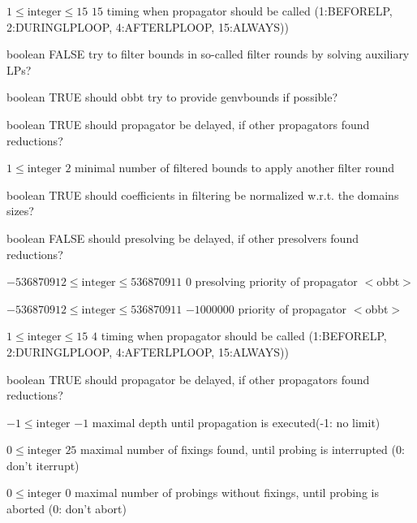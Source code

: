 %
{$1\leq\textrm{integer}\leq15$}%
{$15$}%
{timing when propagator should be called (1:BEFORELP, 2:DURINGLPLOOP, 4:AFTERLPLOOP, 15:ALWAYS))}%
{}

%
{boolean}%
{FALSE}%
{try to filter bounds in so-called filter rounds by solving auxiliary LPs?}%
{}

%
{boolean}%
{TRUE}%
{should obbt try to provide genvbounds if possible?}%
{}

%
{boolean}%
{TRUE}%
{should propagator be delayed, if other propagators found reductions?}%
{}

%
{$1\leq\textrm{integer}$}%
{$2$}%
{minimal number of filtered bounds to apply another filter round}%
{}

%
{boolean}%
{TRUE}%
{should coefficients in filtering be normalized w.r.t. the domains sizes?}%
{}

%
{boolean}%
{FALSE}%
{should presolving be delayed, if other presolvers found reductions?}%
{}

%
{$-536870912\leq\textrm{integer}\leq536870911$}%
{$0$}%
{presolving priority of propagator $<$obbt$>$}%
{}

%
{$-536870912\leq\textrm{integer}\leq536870911$}%
{$-1000000$}%
{priority of propagator $<$obbt$>$}%
{}

%
{$1\leq\textrm{integer}\leq15$}%
{$4$}%
{timing when propagator should be called (1:BEFORELP, 2:DURINGLPLOOP, 4:AFTERLPLOOP, 15:ALWAYS))}%
{}

%
{boolean}%
{TRUE}%
{should propagator be delayed, if other propagators found reductions?}%
{}

%
{$-1\leq\textrm{integer}$}%
{$-1$}%
{maximal depth until propagation is executed(-1: no limit)}%
{}

%
{$0\leq\textrm{integer}$}%
{$25$}%
{maximal number of fixings found, until probing is interrupted (0: don't iterrupt)}%
{}

%
{$0\leq\textrm{integer}$}%
{$0$}%
{maximal number of probings without fixings, until probing is aborted (0: don't abort)}%
{}

